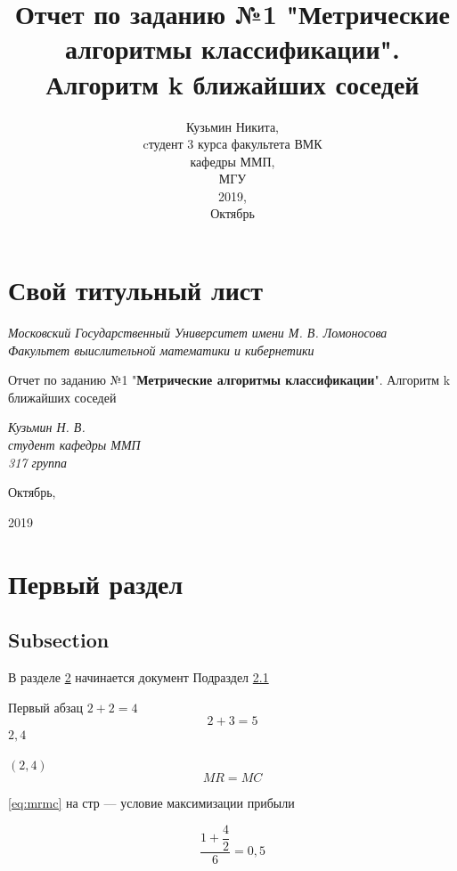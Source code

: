 \documentclass[a4paper, 12pt]{article}
\title{\centering Отчет по заданию №1 "\textbf{Метрические алгоритмы классификации}". Алгоритм k ближайших соседей}
\date{\vspace*{\fill}Кузьмин Никита, \\ cтудент 3 курса факультета ВМК \\ кафедры ММП, \\ МГУ \\ 2019, \\ Октябрь}
\begin{document}
\maketitle

\section{Свой титульный лист}
\newpage
\thispagestyle{empty}
\begin{center}
    \textit{Московский Государственный Университет имени М. В. Ломоносова\\
        Факультет выислительной математики и кибернетики}
    \vspace{0.5ex}
    \vspace{30ex}
    
    Отчет по заданию №1 "\textbf{Метрические алгоритмы классификации}". Алгоритм k ближайших соседей
    
\end{center}
\vspace{13ex}
\begin{flushright}
    \noindent %
    \vfill
    \textit{Кузьмин Н. В.}
    \\
    \textit{студент кафедры ММП \\ 317 группа}
    
\end{flushright}
\begin{center}
    Октябрь,
    
    2019
\end{center}

\newpage
\section{Первый раздел}\label{razdel}
\subsection{Subsection}\label{podrazdel}
В разделе \ref{razdel} начинается документ
Подраздел \ref{podrazdel}  

\newpage
Первый абзац
$ 2 + 2 = 4$
\[2 + 3 = 5\]
$2,4$

$(2, 4)$
\begin{equation}\label{eq:mrmc}
MR=MC
\end{equation}

\eqref{eq:mrmc} на стр \pageref{eq:mrmc} ---  условие максимизации прибыли

\[\frac{1+\dfrac{4}{2}}{6} = 0,5\]
\end{document}
